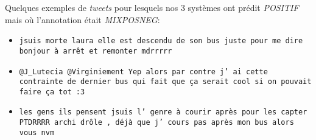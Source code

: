 Quelques exemples de \textit{tweets} pour lesquels nos 3 systèmes ont prédit \emph{POSITIF} mais où l'annotation était \emph{MIXPOSNEG}:
\begin{itemize}
\item \texttt{jsuis morte laura elle est descendu de son bus juste pour me dire bonjour à arrêt et remonter mdrrrrr}
\item \texttt{@J\_Lutecia @Virginiement Yep alors par contre j' ai cette contrainte de dernier bus qui fait que ça serait cool si on pouvait faire ça tot :3}
\item \texttt{les gens ils pensent jsuis l' genre à courir après pour les capter PTDRRRR archi drôle , déjà que j' cours pas après mon bus alors vous nvm}
\end{itemize}




